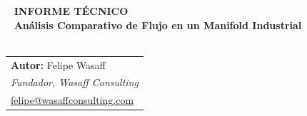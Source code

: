 \documentclass[11pt, a4paper,oneside]{article}
\begin{document}
\sffamily

\
\vspace{1cm}
{\color{WasaffCopper} \large \textbf{INFORME TÉCNICO}}\\
\
{\color{WasaffNavy} \huge \textbf{Análisis Comparativo de Flujo en un Manifold Industrial}}\\
\
\vspace{1cm}
\
\rmfamily
\begin{tabular}{@{}p{14cm}}
    \textbf{Autor:} Felipe Wasaff \\
    \textit{Fundador, Wasaff Consulting} \\
    \href{mailto:felipe@wasaffconsulting.com}{felipe@wasaffconsulting.com} \\
\end{tabular}
\vspace{1cm}
\end{document}
